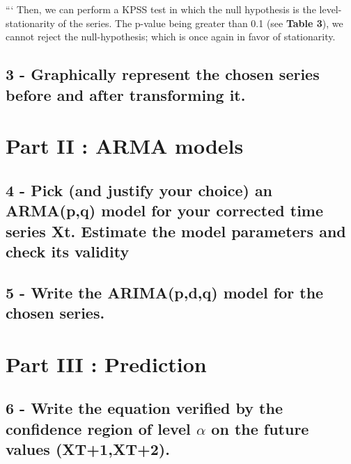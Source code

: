 \documentclass[
]{article}
\begin{document}
``` Then, we can perform a KPSS test in which the null hypothesis is the
level-stationarity of the series. The p-value being greater than 0.1
(see \textbf{Table 3}), we cannot reject the null-hypothesis; which is
once again in favor of stationarity.

\hypertarget{graphically-represent-the-chosen-series-before-and-after-transforming-it.}{%
\subsection{3 - Graphically represent the chosen series before and after
transforming
it.}\label{graphically-represent-the-chosen-series-before-and-after-transforming-it.}}

\hypertarget{part-ii-arma-models}{%
\section{Part II : ARMA models}\label{part-ii-arma-models}}

\hypertarget{pick-and-justify-your-choice-an-armapq-model-for-your-corrected-time-series-xt.-estimate-the-model-parameters-and-check-its-validity}{%
\subsection{4 - Pick (and justify your choice) an ARMA(p,q) model for
your corrected time series Xt. Estimate the model parameters and check
its
validity}\label{pick-and-justify-your-choice-an-armapq-model-for-your-corrected-time-series-xt.-estimate-the-model-parameters-and-check-its-validity}}

\hypertarget{write-the-arimapdq-model-for-the-chosen-series.}{%
\subsection{5 - Write the ARIMA(p,d,q) model for the chosen
series.}\label{write-the-arimapdq-model-for-the-chosen-series.}}

\hypertarget{part-iii-prediction}{%
\section{Part III : Prediction}\label{part-iii-prediction}}

\hypertarget{write-the-equation-verified-by-the-confidence-region-of-level-alpha-on-the-future-values-xt1xt2.}{%
\subsection{\texorpdfstring{6 - Write the equation verified by the
confidence region of level \(\alpha\) on the future values
(XT+1,XT+2).}{6 - Write the equation verified by the confidence region of level \textbackslash alpha on the future values (XT+1,XT+2).}}\label{write-the-equation-verified-by-the-confidence-region-of-level-alpha-on-the-future-values-xt1xt2.}}
\end{document}
